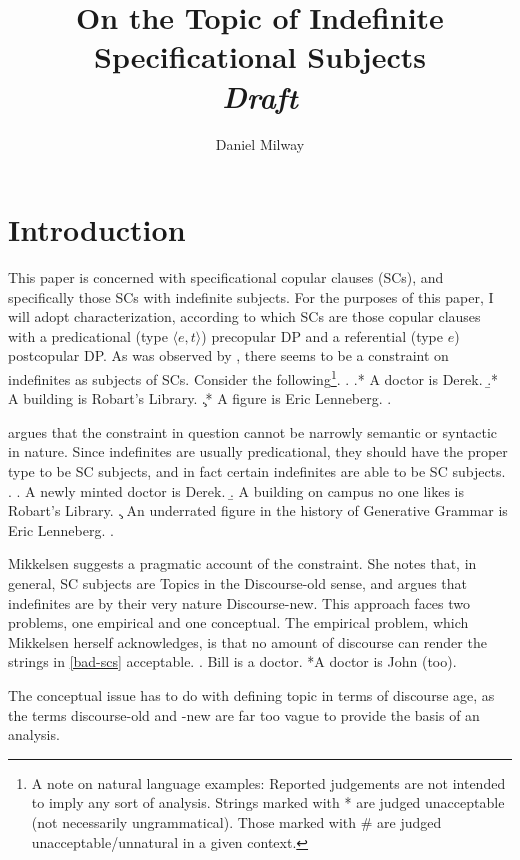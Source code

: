 \documentclass[letterpaper]{article}
\title{On the Topic of Indefinite Specificational Subjects\\\textit{Draft}}
\author{Daniel Milway}
\begin{document}
\maketitle
\section{Introduction}
This paper is concerned with specificational copular clauses (SCs), and specifically those SCs with indefinite subjects.
For the purposes of this paper, I will adopt  characterization, according to which SCs are those copular clauses with a predicational (type $\langle e,t\rangle$) precopular DP and a referential (type $e$) postcopular DP.
As was observed by \textcite{higgins1973pseudo}, there  seems to be a constraint on indefinites as subjects of SCs.
Consider the following\footnote{
	A note on natural language examples:
	Reported judgements are not intended to imply any sort of analysis.
	Strings marked with * are judged unacceptable (not necessarily ungrammatical).
	Those marked with \# are judged unacceptable/unnatural in a given context.
}.
\ex.\label{ex:badSCs}
\a.* A doctor is Derek.
\b.* A building is Robart's Library.
\c.* A figure is Eric Lenneberg. 
\z.

\textcite{mikkelsen2004specifying} argues that the constraint in question cannot be narrowly semantic or syntactic in nature.
Since indefinites are usually predicational, they should have the proper type to be SC subjects, and in fact certain indefinites are able to be SC subjects.
\ex.\label{ex:good-scs}
\a. A newly minted doctor is Derek.
\b. A building on campus no one likes is Robart's Library.
\c. An underrated figure in the history of Generative Grammar is Eric Lenneberg.
\z.

Mikkelsen suggests a pragmatic account of the constraint.
She notes that, in general, SC subjects are Topics in the Discourse-old sense, and argues that indefinites are by their very nature Discourse-new.
This approach faces two problems, one empirical and one conceptual.
The empirical problem, which Mikkelsen herself acknowledges, is that no amount of discourse can render the strings in \ref{bad-scs} acceptable.
\ex. Bill is a doctor. *A doctor is John (too). \hfill \parencite[Adapted from][p. 236]{mikkelsen2004specifying}

The conceptual issue has to do with defining topic in terms of discourse age, as the terms discourse-old and -new are far too vague to provide the basis of an analysis.
\end{document}
